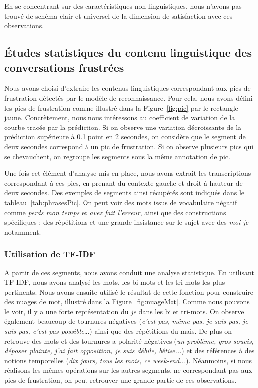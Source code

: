 En se concentrant sur des caractéristiques non linguistiques, nous n'avons pas trouvé de schéma clair et universel de la dimension de satisfaction avec ces observations.

\subsection{Études statistiques du contenu linguistique des conversations frustrées}
Nous avons choisi d'extraire les contenus linguistiques correspondant aux pics de frustration détectés par le modèle de reconnaissance. Pour cela, nous avons défini les pics de frustration comme illustré dans la Figure~\ref{fig:pic} par le rectangle jaune. Concrètement, nous nous intéressons au coefficient de variation de la courbe tracée par la prédiction. Si on observe une variation décroissante de la prédiction supérieure à 0.1 point en 2 secondes, on considère que le segment de deux secondes correspond à un pic de frustration. Si on observe plusieurs pics qui se chevauchent, on regroupe les segments sous la même annotation de pic.



Une fois cet élément d'analyse mis en place, nous avons extrait les transcriptions correspondant à ces pics, en prenant du contexte gauche et droit à hauteur de deux secondes. Des exemples de segments ainsi récupérés sont indiqués dans le tableau~\ref{tab:phrasesPic}. On peut voir des mots issus de vocabulaire négatif comme \textit{perds mon temps} et \textit{avez fait l'erreur}, ainsi que des constructions spécifiques : des répétitions et une grande insistance sur le sujet avec des \textit{moi je} notamment.

\subsubsection{Utilisation de TF-IDF}



A partir de ces segments, nous avons conduit une analyse statistique. En utilisant TF-IDF, nous avons analysé les mots, les bi-mots et les tri-mots les plus pertinents. Nous avons ensuite utilisé le résultat de cette fonction pour construire des nuages de mot, illustré dans la Figure~\ref{fig:nuageMot}. Comme nous pouvons le voir, il y a une forte représentation du \textit{je} dans les bi et tri-mots. On observe également beaucoup de tournures négatives (\textit{c'est pas, même pas, je sais pas, je suis pas, c'est pas possible}...) ainsi que des répétitions du mais. De plus on retrouve des mots et des tournures a polarité négatives (\textit{un problème, gros soucis, déposer plainte, j'ai fait opposition, je suis débile, bêtise...}) et des références à des notions temporelles (\textit{dix jours, tous les mois, ce week-end...}). Néanmoins, si nous réalisons les mêmes opérations sur les autres segments, ne correspondant pas aux pics de frustration, on peut retrouver une grande partie de ces observations.

